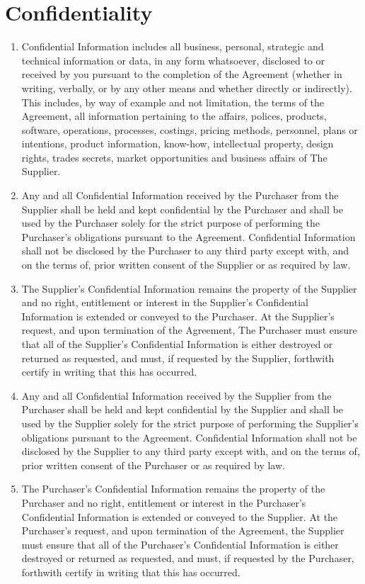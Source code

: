\documentclass[nz-terms]{subfiles}
\begin{document}
\section{Confidentiality}

\begin{enumerate}
\item Confidential Information includes all business, personal, strategic and
technical information or data, in any form whatsoever, disclosed to or
received by you pursuant to the completion of the Agreement (whether in
writing, verbally, or by any other means and whether directly or indirectly).
This includes, by way of example and not limitation, the terms of the
Agreement, all information pertaining to the affairs, polices, products,
software, operations, processes, costings, pricing methods, personnel, plans
or intentions, product information, know-how, intellectual property, design
rights, trades secrets, market opportunities and business affairs of The
Supplier.
\item Any and all Confidential Information received by the Purchaser from the
Supplier shall be held and kept confidential by the Purchaser and shall be
used by the Purchaser solely for the strict purpose of performing the
Purchaser's obligations pursuant to the Agreement. Confidential Information
shall not be disclosed by the Purchaser to any third party except with, and
on the terms of, prior written consent of the Supplier or as required by law.
\item The Supplier's Confidential Information remains the property of the
Supplier and no right, entitlement or interest in the Supplier's Confidential
Information is extended or conveyed to the Purchaser. At the Supplier's
request, and upon termination of the Agreement, The Purchaser must ensure
that all of the Supplier's Confidential Information is either destroyed or
returned as requested, and must, if requested by the Supplier, forthwith
certify in writing that this has occurred.
\item Any and all Confidential Information received by the Supplier from the
Purchaser shall be held and kept confidential by the Supplier and shall be
used by the Supplier solely for the strict purpose of performing the
Supplier's obligations pursuant to the Agreement. Confidential Information
shall not be disclosed by the Supplier to any third party except with, and on
the terms of, prior written consent of the Purchaser or as required by law.
\item The Purchaser's Confidential Information remains the property of the
Purchaser and no right, entitlement or interest in the Purchaser's
Confidential Information is extended or conveyed to the Supplier. At the
Purchaser's request, and upon termination of the Agreement, the Supplier must
ensure that all of the Purchaser's Confidential Information is either
destroyed or returned as requested, and must, if requested by the Purchaser,
forthwith certify in writing that this has occurred.
\end{enumerate}
\end{document}
